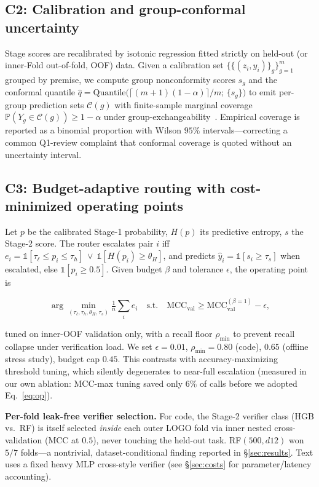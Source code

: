 \documentclass[conference]{IEEEtran}
\newcommand{\mcc}{\mathrm{MCC}}
\begin{document}
\subsection{C2: Calibration and group-conformal uncertainty}
Stage scores are recalibrated by isotonic regression fitted strictly on held-out (or inner-Fold
out-of-fold, OOF) data. Given a calibration set $\{\{(z_i,y_i)\}_g\}_{g=1}^{m}$ grouped by premise,
we compute group nonconformity scores $s_g$ and the conformal quantile
$\hat{q} = \mathrm{Quantile}\!\big(\lceil (m{+}1)(1{-}\alpha)\rceil/m;\, \{s_g\}\big)$
to emit per-group prediction sets $\mathcal{C}(g)$ with finite-sample marginal coverage
$\mathbb{P}(Y_{g}\in\mathcal{C}(g))\ge 1-\alpha$ under group-exchangeability~\cite{vovk2005}.
Empirical coverage is reported as a binomial proportion with Wilson $95\%$ intervals---correcting a
common Q1-review complaint that conformal coverage is quoted without an uncertainty interval.

\subsection{C3: Budget-adaptive routing with cost-minimized operating points}
Let $p$ be the calibrated Stage-1 probability, $H(p)$ its predictive entropy, $s$ the Stage-2 score.
The router escalates pair $i$ iff
$e_i = \mathbb{1}[\tau_\ell \le p_i \le \tau_h]\ \lor\ \mathbb{1}[H(p_i)\ge\theta_H]$,
and predicts $\hat{y}_i = \mathbb{1}[s_i \ge \tau_s]$ when escalated, else
$\mathbb{1}[p_i \ge 0.5]$. Given budget $\beta$ and tolerance $\epsilon$, the operating point is

\begin{equation}
\arg\min_{(\tau_\ell,\tau_h,\theta_H,\tau_s)} \tfrac{1}{n}\textstyle\sum_i e_i
\quad \text{s.t.}\quad
\mcc_{\mathrm{val}} \ge \mcc_{\mathrm{val}}^{(\beta=1)} - \epsilon ,
\label{eq:op}
\end{equation}

\noindent tuned on inner-OOF validation only, with a recall floor $\rho_{\min}$ to prevent recall
collapse under verification load. We set $\epsilon{=}0.01$, $\rho_{\min}{=}0.80$ (code),
$0.65$ (offline stress study), budget cap $0.45$. This contrasts with accuracy-maximizing
threshold tuning, which silently degenerates to near-full escalation (measured in our own
ablation: MCC-max tuning saved only $6\%$ of calls before we adopted Eq.~\eqref{eq:op}).

\textbf{Per-fold leak-free verifier selection.} For code, the Stage-2 verifier class (HGB vs.\ RF)
is itself selected \emph{inside} each outer LOGO fold via inner nested cross-validation (MCC at
$0.5$), never touching the held-out task. RF$(500,\!d12)$ won $5/7$ folds---a nontrivial,
dataset-conditional finding reported in \S\ref{sec:results}. Text uses a fixed heavy MLP
cross-style verifier (see \S\ref{sec:costs} for parameter/latency accounting).
\end{document}
